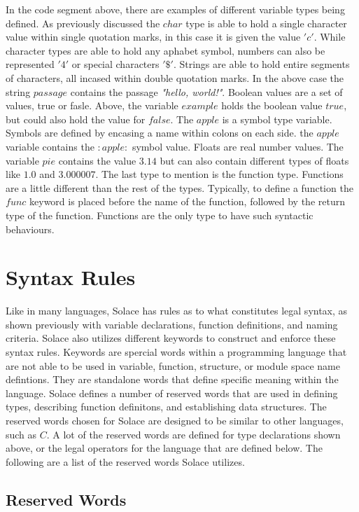 \documentclass{article}
\begin{document}
In the code segment above, there are examples of different variable types being defined. As previously discussed the $char$ type is able to hold a single character value
within single quotation marks, in this case it is given the value $'c'$. While character types are able to hold any aphabet symbol, numbers can also be represented $'4'$
or special characters $'\$'$. Strings are able to hold entire segments of characters, all incased within double quotation marks. In the above case the string $passage$
contains the passage \textit{"hello, world!"}. Boolean values are a set of values, true or fasle. Above, the variable $example$ holds the boolean value $true$, but could also
hold the value for $false$. The $apple$ is a symbol type variable. Symbols are defined by encasing a name within colons on each side. the $apple$ variable contains the $:apple:$
symbol value. Floats are real number values. The variable $pie$ contains the value $3.14$ but can also contain different types of floats like $1.0$ and $3.000007$. The last 
type to mention is the function type. Functions are a little different than the rest of the types. Typically, to define a function the $func$ keyword is placed before the
name of the function, followed by the return type of the function. Functions are the only type to have such syntactic behaviours.


\section{Syntax Rules}

Like in many languages, Solace has rules as to what constitutes legal syntax, as shown previously with variable declarations, function definitions, and naming criteria. Solace
also utilizes different keywords to construct and enforce these syntax rules. Keywords are spercial words within a programming language that are not able to be used in variable,
function, structure, or module space name defintions. They are standalone words that define specific meaning within the language.
Solace defines a number of reserved words that are used in defining types, describing function definitons, and establishing data structures. The reserved words chosen
for Solace are designed to be similar to other languages, such as $C$. A lot of the reserved words are defined for type declarations shown above, or the legal operators for the 
language that are defined below. The following are a list of the reserved words Solace utilizes.


\subsection{Reserved Words}
\end{document}
